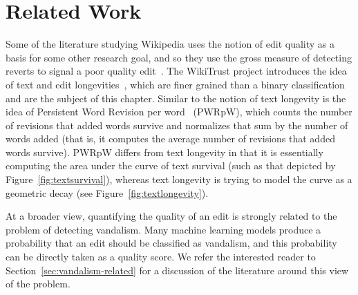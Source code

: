\section{Related Work}

Some of the literature studying Wikipedia uses the notion of edit
quality as a basis for some other research goal, and so they use the
gross measure of detecting reverts to signal a poor quality
edit~\cite{Adler2007,Smets2008,Itakura2009,Belani2010}.
The WikiTrust project introduces the idea of text and edit
longevities~\cite{Adler2007}, which are finer grained than a
binary classification and are the subject of this chapter.
Similar to the notion of text longevity is the idea
of Persistent Word Revision per
word~\cite{Halfaker2009,Halfaker2011} (PWRpW),
which counts the number of revisions that added words survive
and normalizes that sum by the number of words added (that is,
it computes the average number of revisions that added words survive).
PWRpW differs from text longevity in that it is essentially computing
the area under the curve of text survival (such as that depicted by
Figure~\ref{fig:textsurvival}),
whereas text longevity is trying to model the curve as a
geometric decay (see Figure~\ref{fig:textlongevity}).

At a broader view, quantifying the quality of an edit is strongly
related to the problem of detecting vandalism.
Many machine learning models produce a probability that an edit
should be classified as vandalism, and this probability can be
directly taken as a quality score.
We refer the interested reader to Section~\ref{sec:vandalism-related}
for a discussion of the literature around this view of the problem.

